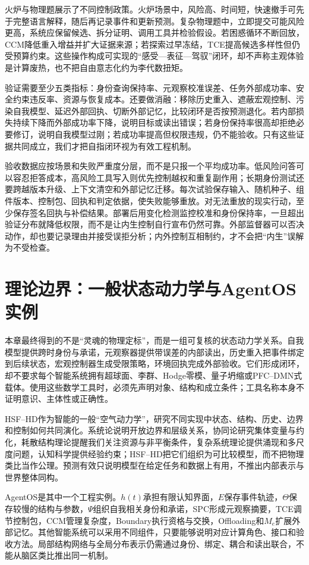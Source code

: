 火炉与物理题展示了不同控制政策。火炉场景中，风险高、时间短，快速撤手可先于完整语言解释，随后再记录事件和更新预测。复杂物理题中，立即提交可能风险更高，系统应保留候选、拆分证明、调用工具并检验假设。若困惑循环不断回放，CCM降低重入增益并扩大证据来源；若探索过早冻结，TCE提高候选多样性但仍受预算约束。这些操作构成可实现的“感受—表征—驾驭”闭环，却不声称主观体验是计算废热，也不把自由意志化约为李代数扭矩。

验证需要至少五类指标：身份查询保持率、元观察校准误差、任务外部成功率、安全约束违反率、资源与恢复成本。还要做消融：移除历史重入、遮蔽宏观控制、污染自我模型、延迟外部回执、切断外部记忆，比较闭环是否按预测退化。若内部损失持续下降而外部成功率下降，说明目标或读出错误；若身份保持率很高却拒绝必要修订，说明自我模型过刚；若成功率提高但权限违规，仍不能验收。只有这些证据共同成立，我们才把自指闭环视为有效工程机制。

验收数据应按场景和失败严重度分层，而不是只报一个平均成功率。低风险问答可以容忍拒答成本，高风险工具写入则优先控制越权和重复副作用；长期身份测试还要跨越版本升级、上下文清空和外部记忆迁移。每次试验保存输入、随机种子、组件版本、控制包、回执和判定依据，使失败能够重放。对无法重放的现实行动，至少保存签名回执与补偿结果。部署后用变化检测监控校准和身份保持率，一旦超出验证分布就降低权限，而不是让内生控制自行宣布仍然可靠。外部监督器可以否决动作，却也要记录理由并接受误拒分析；内外控制互相制约，才不会把“内生”误解为不受检查。

\section{理论边界：一般状态动力学与AgentOS实例}

本章最终得到的不是“灵魂的物理定标”，而是一组可复核的状态动力学关系。自我模型提供跨时身份与承诺，元观察器提供带误差的内部读出，历史重入把事件绑定到后续状态，宏观控制器生成受限策略，环境回执完成外部验收。它们形成闭环，却不要求每个智能系统拥有超球面、李群、Hodge零模、量子坍缩或PFC--DMN式载体。使用这些数学工具时，必须先声明对象、结构和成立条件；工具名称本身不证明意识、主体性或正确性。

HSF--HD作为智能的一般“空气动力学”，研究不同实现中状态、结构、历史、边界和控制如何共同演化。系统论说明开放边界和层级关系，协同论研究集体变量与约化，耗散结构理论提醒我们关注资源与非平衡条件，复杂系统理论提供涌现和多尺度问题，认知科学提供经验约束；HSF--HD把它们组织为可比较模型，而不把物理类比当作公理。预测有效只说明模型在给定任务和数据上有用，不推出内部表示与世界整体同构。

AgentOS是其中一个工程实例。$h(t)$承担有限认知界面，$E$保存事件轨迹，$\Theta$保存较慢的结构与参数，$\Psi$组织自我相关身份和承诺，SPC形成元观察摘要，TCE调节控制包，CCM管理复杂度，Boundary执行资格与交换，Offloading和$M_e$扩展外部记忆。其他智能系统可以采用不同组件，只要能够说明对应计算角色、接口和验收方法。局部结构网络与全局分布表示仍需通过身份、绑定、耦合和读出联合，不能从脑区类比推出同一机制。

